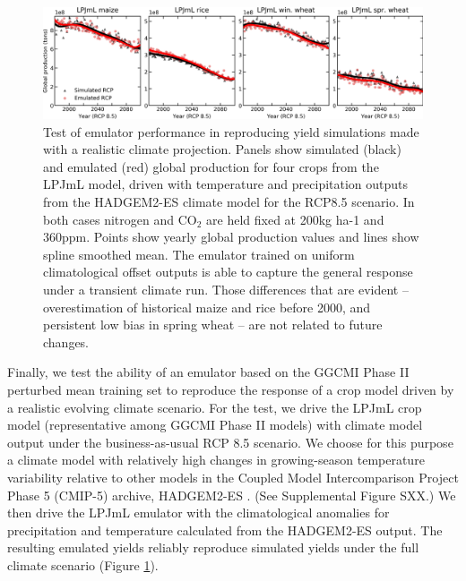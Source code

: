 \documentclass[gmd, manuscript]{copernicus} %
\begin{document}
\begin{figure}[ht]
  \centering
  \includegraphics[width = 16.3cm]{figures/LPJMLRCP85comp.png}
  \caption{
  Test of emulator performance in reproducing yield simulations made with a realistic climate projection. 
  Panels show simulated (black) and emulated (red) global production for four crops from the LPJmL model, driven with temperature and precipitation outputs from the HADGEM2-ES climate model for the RCP8.5 scenario. In both cases nitrogen and CO$_2$ are held fixed at 200kg ha-1 and 360ppm.
  Points show yearly global production values and lines show spline smoothed mean.
  The emulator trained on uniform climatological offset outputs is able to capture the general response under a transient climate run. 
  Those differences that are evident -- overestimation of historical maize and rice before 2000, and persistent low bias in spring wheat -- are not related to future changes.
  }
  \label{fig:lpjmlrcp}
\end{figure}

Finally, we test the ability of an emulator based on the GGCMI Phase II perturbed mean training set to reproduce the response of a crop model driven by a realistic evolving climate scenario.
For the test, we drive the LPJmL crop model (representative among GGCMI Phase II models) with climate model output under the business-as-usual RCP 8.5 scenario.
We choose for this purpose a climate model with relatively high changes in growing-season temperature variability relative to other models in the Coupled Model Intercomparison Project Phase 5 (CMIP-5) archive, HADGEM2-ES \citep{Jones2011h}. (See Supplemental Figure SXX.)
We then drive the LPJmL emulator with the climatological anomalies for precipitation and temperature calculated from the HADGEM2-ES output. The resulting emulated yields reliably reproduce simulated yields under the full climate scenario (Figure \ref{fig:lpjmlrcp}). 
\end{document}
